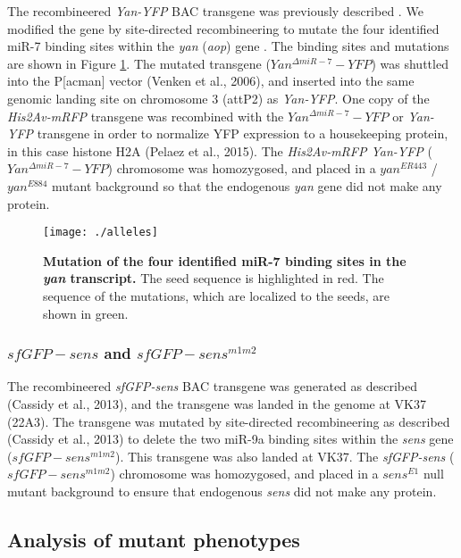 The recombineered \textit{Yan-YFP} BAC transgene was previously described \cite{Webber2013}. We modified the gene by site-directed recombineering to mutate the four identified miR-7 binding sites within the \textit{yan} (\textit{aop}) gene \cite{Li2005}. The binding sites and mutations are shown in Figure \ref{fig:metabolism:methods:alleles}. The mutated transgene ($Yan^{\Delta miR-7}-YFP$) was shuttled into the P{[}acman{]} vector (Venken et al., 2006), and inserted into the same genomic landing site on chromosome 3 (attP2) as \textit{Yan-YFP}. One copy of the \textit{His2Av-mRFP} transgene was recombined with the $Yan^{\Delta miR-7}-YFP$ or \textit{Yan-YFP} transgene in order to normalize YFP expression to a housekeeping protein, in this case histone H2A (Pelaez et al., 2015). The \textit{His2Av-mRFP Yan-YFP} ($Yan^{\Delta miR-7}-YFP$) chromosome was homozygosed, and placed in a $yan^{ER443}$ / $yan^{E884}$ mutant background so that the endogenous \textit{yan} gene did not make any protein.

\begin{figure}[h!]
\label{fig:metabolism:methods:alleles}
\centering
\texttt{[image: ./alleles]}
\caption[Mutation of the four identified miR-7 binding sites in the \textit{yan} transcript.]{\textbf{Mutation of the four identified miR-7 binding sites in the \textit{yan} transcript.} The seed sequence is highlighted in red. The sequence of the mutations, which are localized to the seeds, are shown in green.}
\end{figure}

\subsubsection{$sfGFP-sens$ and $sfGFP-sens^{m1m2}$}
\label{appendix:supp:metabolism:exp:sfgfp_sens}

The recombineered \textit{sfGFP-sens} BAC transgene was generated as described (Cassidy et al., 2013), and the transgene was landed in the genome at VK37 (22A3). The transgene was mutated by site-directed recombineering as described (Cassidy et al., 2013) to delete the two miR-9a binding sites within the \textit{sens} gene ($sfGFP-sens^{m1m2}$). This transgene was also landed at VK37. The \textit{sfGFP-sens} ($sfGFP-sens^{m1m2}$) chromosome was homozygosed, and placed in a $sens^{E1}$ null mutant background to ensure that endogenous \textit{sens} did not make any protein.

\subsection{Analysis of mutant phenotypes}
\label{appendix:supp:metabolism:exp:phenotypes}

